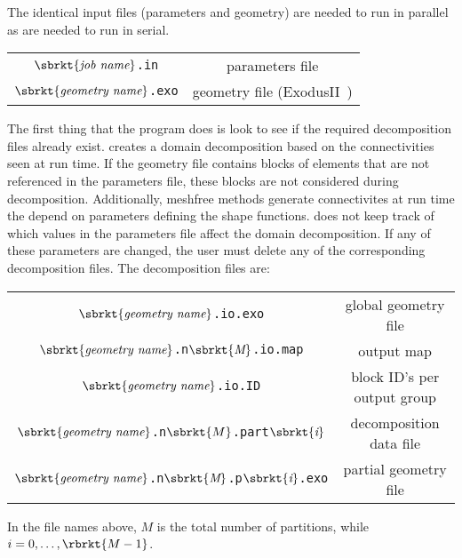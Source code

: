The identical input files (parameters and geometry) are needed to run in
parallel as are needed to run in serial.
\begin{center}
\begin{tabular}[c]{c c}
 \parbox[b]{3.0in}{\raggedleft $\sbrkt{\textit{job name}}$\texttt{.in}}
&\parbox[b]{3.0in}{parameters file}\\
 \parbox[b]{3.0in}{\raggedleft $\sbrkt{\textit{geometry name}}$\texttt{.exo}}
&\parbox[b]{3.0in}{geometry file (\textsf{ExodusII}~\cite{ExodusII})}\\
\end{tabular}
\end{center}
The first thing that the program does is look to see if the required
decomposition files already exist.  \tahoe creates a domain decomposition
based on the connectivities seen at run time.  If the geometry file
contains blocks of elements that are not referenced in the parameters file,
these blocks are not considered during decomposition.  Additionally,
meshfree methods generate connectivites at run time the depend on
parameters defining the shape functions.  \tahoe does not keep track of
which values in the parameters file affect the domain decomposition.  If
any of these parameters are changed, the user must delete any of the
corresponding decomposition files.  The decomposition files are:
\begin{center}
\begin{tabular}[c]{c c}
 \parbox[b]{3.0in}{\raggedleft $\sbrkt{\textit{geometry name}}$\texttt{.io.exo}}
&\parbox[b]{3.0in}{global geometry file}\\
 \parbox[b]{3.0in}{\raggedleft $\sbrkt{\textit{geometry name}}$\texttt{.n}$\sbrkt{\textit{M}}$\texttt{.io.map}}
&\parbox[b]{3.0in}{output map}\\
 \parbox[b]{3.0in}{\raggedleft $\sbrkt{\textit{geometry name}}$\texttt{.io.ID}}
&\parbox[b]{3.0in}{block ID's per output group}\\
 \parbox[b]{3.0in}{\raggedleft $\sbrkt{\textit{geometry name}}$\texttt{.n}$\sbrkt{{M}}$\texttt{.part}$\sbrkt{\textit{i}}$}
&\parbox[b]{3.0in}{decomposition data file}\\
 \parbox[b]{3.0in}{\raggedleft $\sbrkt{\textit{geometry name}}$\texttt{.n}$\sbrkt{\textit{M}}$\texttt{.p}$\sbrkt{\textit{i}}$\texttt{.exo}}
&\parbox[b]{3.0in}{partial geometry file}
\end{tabular}
\end{center}
In the file names above, $M$ is the total number of partitions, 
while $i = 0,\ldots,\rbrkt{M - 1}$.

